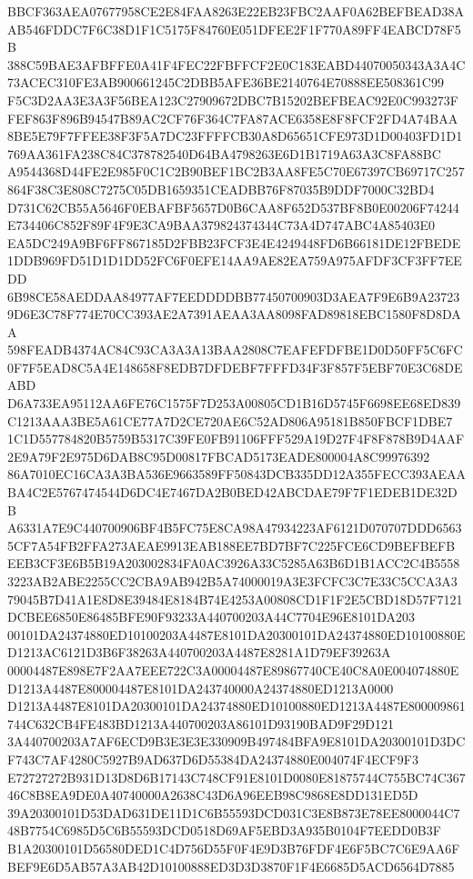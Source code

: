 \documentclass[UTF8,fontset=fandol,zihao=-4,a4paper]{ctexart}
\begin{document}
{{BBCF363AEA07677958CE2E84FAA8263E22EB23FBC2AAF0A62BEFBEAD38AAB546FDDC7F6C38D1F1C5175F84760E051DFEE2F1F770A89FF4EABCD78F5B
388C59BAE3AFBFFE0A41F4FEC22FBFFCF2E0C183EABD44070050343A3A4C73ACEC310FE3AB900661245C2DBB5AFE36BE2140764E70888EE508361C99
F5C3D2AA3E3A3F56BEA123C27909672DBC7B15202BEFBEAC92E0C993273FFEF863F896B94547B89AC2CF76F364C7FA87ACE6358E8F8FCF2FD4A74BAA
8BE5E79F7FFEE38F3F5A7DC23FFFFCB30A8D65651CFE973D1D00403FD1D1769AA361FA238C84C378782540D64BA4798263E6D1B1719A63A3C8FA88BC
A9544368D44FE2E985F0C1C2B90BEF1BC2B3AA8FE5C70E67397CB69717C257864F38C3E808C7275C05DB1659351CEADBB76F87035B9DDF7000C32BD4
D731C62CB55A5646F0EBAFBF5657D0B6CAA8F652D537BF8B0E00206F74244E734406C852F89F4F9E3CA9BAA379824374344C73A4D747ABC4A85403E0
EA5DC249A9BF6FF867185D2FBB23FCF3E4E4249448FD6B66181DE12FBEDE1DDB969FD51D1D1DD52FC6F0EFE14AA9AE82EA759A975AFDF3CF3FF7EEDD
6B98CE58AEDDAA84977AF7EEDDDDBB77450700903D3AEA7F9E6B9A237239D6E3C78F774E70CC393AE2A7391AEAA3AA8098FAD89818EBC1580F8D8DAA
598FEADB4374AC84C93CA3A3A13BAA2808C7EAFEFDFBE1D0D50FF5C6FC0F7F5EAD8C5A4E148658F8EDB7DFDEBF7FFFD34F3F857F5EBF70E3C68DEABD
D6A733EA95112AA6FE76C1575F7D253A00805CD1B16D5745F6698EE68ED839C1213AAA3BE5A61CE77A7D2CE720AE6C52AD806A95181B850FBCF1DBE7
1C1D557784820B5759B5317C39FE0FB91106FFF529A19D27F4F8F878B9D4AAF2E9A79F2E975D6DAB8C95D00817FBCAD5173EADE800004A8C99976392
86A7010EC16CA3A3BA536E9663589FF50843DCB335DD12A355FECC393AEAABA4C2E5767474544D6DC4E7467DA2B0BED42ABCDAE79F7F1EDEB1DE32DB
A6331A7E9C440700906BF4B5FC75E8CA98A47934223AF6121D070707DDD65635CF7A54FB2FFA273AEAE9913EAB188EE7BD7BF7C225FCE6CD9BEFBEFB
EEB3CF3E6B5B19A203002834FA0AC3926A33C5285A63B6D1B1ACC2C4B55583223AB2ABE2255CC2CBA9AB942B5A74000019A3E3FCFC3C7E33C5CCA3A3
79045B7D41A1E8D8E39484E8184B74E4253A00808CD1F1F2E5CBD18D57F7121DCBEE6850E86485BFE90F93233A440700203A44C7704E96E8101DA203
00101DA24374880ED10100203A4487E8101DA20300101DA24374880ED10100880ED1213AC6121D3B6F38263A440700203A4487E8281A1D79EF39263A
00004487E898E7F2AA7EEE722C3A00004487E89867740CE40C8A0E004074880ED1213A4487E800004487E8101DA243740000A24374880ED1213A0000
D1213A4487E8101DA20300101DA24374880ED10100880ED1213A4487E800009861744C632CB4FE483BD1213A440700203A86101D93190BAD9F29D121
3A440700203A7AF6ECD9B3E3E3E330909B497484BFA9E8101DA20300101D3DCF743C7AF4280C5927B9AD637D6D55384DA24374880E004074F4ECF9F3
E72727272B931D13D8D6B17143C748CF91E8101D0080E81875744C755BC74C36746C8B8EA9DE0A40740000A2638C43D6A96EEB98C9868E8DD131ED5D
39A20300101D53DAD631DE11D1C6B55593DCD031C3E8B873E78EE8000044C748B7754C6985D5C6B55593DCD0518D69AF5EBD3A935B0104F7EEDD0B3F
B1A20300101D56580DED1C4D756D55F0F4E9D3B76FDF4E6F5BC7C6E9AA6FBEF9E6D5AB57A3AB42D10100888ED3D3D3870F1F4E6685D5ACD6564D7885
}}
\end{document}
